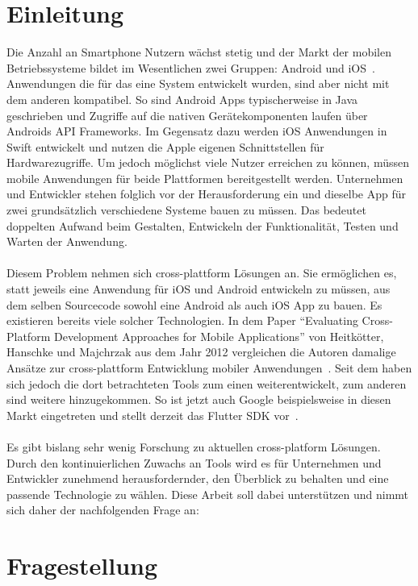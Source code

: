 \section*{Einleitung}

Die Anzahl an Smartphone Nutzern wächst stetig und der Markt der mobilen Betriebssysteme bildet im Wesentlichen zwei Gruppen: Android und iOS~\cite{statista}.
Anwendungen die für das eine System entwickelt wurden, sind aber nicht mit dem anderen kompatibel.
So sind Android Apps typischerweise in Java geschrieben und Zugriffe auf die nativen Gerätekomponenten laufen über Androids API Frameworks.
Im Gegensatz dazu werden iOS Anwendungen in Swift entwickelt und nutzen die Apple eigenen Schnittstellen für Hardwarezugriffe.
Um jedoch möglichst viele Nutzer erreichen zu können, müssen mobile Anwendungen für beide Plattformen bereitgestellt werden. Unternehmen und Entwickler stehen folglich vor der Herausforderung ein und dieselbe App für zwei grundsätzlich verschiedene Systeme bauen zu müssen.
Das bedeutet doppelten Aufwand beim Gestalten, Entwickeln der Funktionalität, Testen und Warten der Anwendung. \\ \\
Diesem Problem nehmen sich cross-plattform Lösungen an. Sie ermöglichen es, statt jeweils eine Anwendung für iOS und Android entwickeln zu müssen, aus dem selben Sourcecode sowohl eine Android als auch iOS App zu bauen.
Es existieren bereits viele solcher Technologien. In dem Paper “Evaluating Cross-Platform Development Approaches for Mobile Applications” von Heitkötter, Hanschke und Majchrzak aus dem Jahr 2012 vergleichen die Autoren damalige Ansätze zur cross-plattform Entwicklung mobiler Anwendungen~\cite{eva12}.
Seit dem haben sich jedoch die dort betrachteten Tools zum einen weiterentwickelt, zum anderen sind weitere hinzugekommen. So ist jetzt auch Google beispielsweise in diesen Markt eingetreten und stellt derzeit das Flutter SDK vor~\cite{flutter}. \\ \\
Es gibt bislang sehr wenig Forschung zu aktuellen cross-platform Lösungen. Durch den kontinuierlichen Zuwachs an Tools wird es für Unternehmen und Entwickler zunehmend herausfordernder, den Überblick zu behalten und eine passende Technologie zu wählen. Diese Arbeit soll dabei unterstützen und nimmt sich daher der nachfolgenden Frage an:

\section*{Fragestellung}


